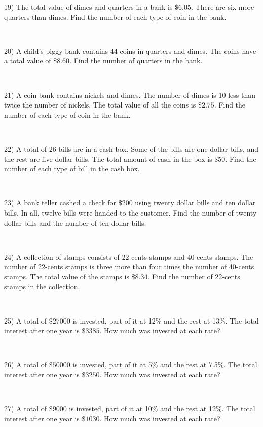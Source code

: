 {19) The total value of dimes and quarters in a bank is $\$6.05$.
There are six more quarters than dimes. Find the number of
each type of coin in the bank.\par
~\par

20) A child's piggy bank contains 44 coins in quarters and dimes. The coins
have a total value of $\$8.60$. Find the number of
quarters in the bank.\par
~\par

21) A coin bank contains nickels and dimes. The number of dimes is 10 less
than twice the number of nickels. The total value of all the coins
is $\$2.75$. Find the number of each type of coin in the
bank.\par
~\par

22) A total of 26 bills are in a cash box. Some of the bills are one dollar
bills, and the rest are five dollar bills. The total amount of cash
in the box is $\$50$. Find  the number of each type of
bill in the cash box.\par
~\par

23) A bank teller cashed a check for $\$200$ using twenty dollar
bills and ten dollar  bills. In all, twelve bills were handed to
the customer. Find the number of twenty dollar bills and
the number of ten dollar bills.\par
~\par

24) A collection of stamps consists of 22-cents stamps and
40-cents stamps. The number of 22-cents stamps is
three more than four times the number of 40-cents stamps. The total value of the stamps is $\$8.34$. Find the number of
22-cents stamps in the collection.\par
~\par

25) A total of $\$27000$ is invested, part of it at 12\% and the rest
at 13\%. The total interest after one year is
$\$3385$. How much was invested at each rate?\par
~\par

26) A total of $\$50000$ is invested, part of it at 5\% and the rest
at 7.5\%. The total interest after one year is $\$3250$.
How much was invested at each rate?\par
~\par

27) A total of $\$9000$ is invested, part of it at 10\% and the rest
at 12\%. The total interest after one year is $\$1030$.
How much was invested at each rate?\par
~\par

}
